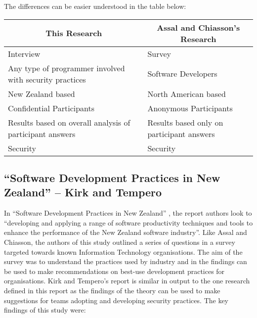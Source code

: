 The differences can be easier understood in the table below:
\newline
\begin{table}[htb]
\begin{tabular}{|l|l|}
\hline
\multicolumn{1}{|c|}{\textbf{This Research}}              & \multicolumn{1}{c|}{\textbf{Assal and Chiasson's Research}} \\ \hline
Interview                 & Survey                 \\ \hline
Any type of programmer involved with security practices  & Software Developers                                        \\ \hline
New Zealand based         & North American based   \\ \hline
Confidential Participants & Anonymous Participants \\ \hline
Results based on overall analysis of participant answers & Results based only on participant answers                  \\ \hline
Security                  & Security \\ \hline
\end{tabular}
\end{table}


\newpage
\subsection{“Software Development Practices in New Zealand” – Kirk and Tempero}

\par In “Software Development Practices in New Zealand” \cite{summary2}, the report authors look to “developing and applying a range of software productivity techniques and tools to enhance the performance of the New Zealand software industry”. Like Assal and Chiasson, the authors of this study outlined a series of questions in a survey targeted towards known Information Technology organisations. The aim of the survey was to understand the practices used by industry and in the findings can be used to make recommendations on best-use development practices for organisations. Kirk and Tempero’s report is similar in output to the one research defined in this report as the findings of the theory can be used to make suggestions for teams adopting and developing security practices. 
\newline
\newline
The key findings of this study were:

